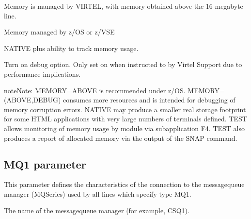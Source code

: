 \documentclass[letterpaper,10pt,english]{sphinxmanual}
\begin{document}
\sphinxAtStartPar
{} \sphinxhyphen{} Memory is managed by VIRTEL, with memory obtained above the 16 megabyte line.

\sphinxAtStartPar
{} \sphinxhyphen{} Memory managed by z/OS or z/VSE

\sphinxAtStartPar
{} \sphinxhyphen{} NATIVE plus ability to track memory usage.

\sphinxAtStartPar
{} \sphinxhyphen{} Turn on debug option. Only set on when instructed to by Virtel Support due to performance implications.

\begin{sphinxadmonition}{note}{Note:}
\sphinxAtStartPar
MEMORY=ABOVE is recommended under z/OS. MEMORY=(ABOVE,DEBUG) consumes more resources and is intended for debugging of memory corruption errors. NATIVE may produce a smaller real storage footprint for some HTML applications with very large numbers of terminals defined. TEST allows monitoring of memory usage by module via sub\sphinxhyphen{}application F4. TEST also produces a report of allocated memory via the output of the SNAP command.
\end{sphinxadmonition}

\ignorespaces 

\subsection{MQ1 parameter}
\label{\detokenize{Installation_Guide:mq1-parameter}}\label{\detokenize{Installation_Guide:index-92}}
\begin{sphinxVerbatim}[commandchars=\\\{\}]
\PYG{p}{[}\PYG{p}{]}           
\end{sphinxVerbatim}

\sphinxAtStartPar
This parameter defines the characteristics of the connection to the message\sphinxhyphen{}queue manager (MQSeries) used by all lines which specify type MQ1.

\sphinxAtStartPar
{} \sphinxhyphen{} The name of the message\sphinxhyphen{}queue manager (for example, CSQ1).
\end{document}
